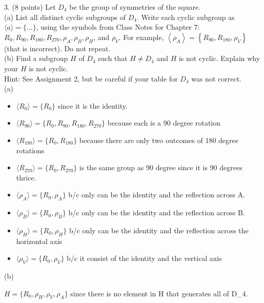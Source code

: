 \documentclass[12pt]{article}
\begin{document}
\newpage

3. (8 points) Let $D_{4}$ be the group of symmetries of the square. \\

(a) List all distinct cyclic subgroups of $D_{4}$. Write each cyclic subgroup as $\langle a\rangle=\{\ldots\}$, using the symbols from Class Notes for Chapter 7: $R_{0}, R_{90}, R_{180}, R_{270}, \rho_{A}, \rho_{B}, \rho_{H}$, and $\rho_{V}$. For example, $\left\langle\rho_{A}\right\rangle=\left\{R_{90}, R_{180}, \rho_{V}\right\}$ (that is incorrect). Do not repeat. \\

(b) Find a subgroup $H$ of $D_{4}$ such that $H \neq D_{4}$ and $H$ is not cyclic. Explain why your $H$ is not cyclic. \\

Hint: See Assignment 2, but be careful if your table for $D_{4}$ was not correct. \\

(a)
\begin{itemize}
    \item \( \langle R_{0} \rangle = \{R_{0}\} \)  since it is the identity.
    \item \( \langle R_{90} \rangle = \{R_{0}, R_{90}, R_{180}, R_{270}\} \) because each is a 90 degree rotation
    \item \( \langle R_{180} \rangle = \{R_{0}, R_{180}\} \) because there are only two outcomes of 180 degree rotations
    \item \( \langle R_{270} \rangle = \{R_{0}, R_{270}\} \) is the same group as 90 degree since it is 90 degrees thrice.
    \item \( \langle \rho_{A} \rangle = \{R_{0}, \rho_{A}\} \) b/c only can be the identity and the reflection across A.
    \item \( \langle \rho_{B} \rangle = \{R_{0}, \rho_{B}\} \) b/c only can be the identity and the reflection across B.
    \item \( \langle \rho_{H} \rangle = \{R_{0}, \rho_{H}\} \) b/c only can be the identity and the reflection across the horizontal axis
    \item \( \langle \rho_{V} \rangle = \{R_{0}, \rho_{V}\} \) b/c it consist of the identity and the vertical axis
\end{itemize}
(b)

$H = \{R_{0}, \rho_{H}, \rho_{V}, \rho_{A}\}$ since there is no element in H that generates all of D_4.
\end{document}
